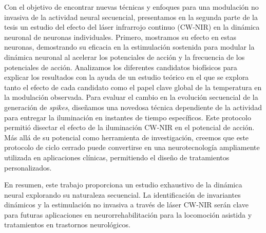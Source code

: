 Con el objetivo de encontrar nuevas técnicas y enfoques para una modulación no invasiva de la actividad neural secuencial, presentamos en la segunda parte de la tesis un estudio del efecto del láser infrarrojo continuo (CW-NIR) en la dinámica neuronal de neuronas individuales. Primero, mostramos su efecto en estas neuronas, demostrando su eficacia en la estimulación sostenida para modular la dinámica neuronal al acelerar los potenciales de acción y la frecuencia de los potenciales de acción. Analizamos los diferentes candidatos biofísicos para explicar los resultados con la ayuda de un estudio teórico en el que se explora tanto el efecto de cada candidato como el papel clave global de la temperatura en la modulación observada. Para evaluar el cambio en la evolución secuencial de la generación de \textit{spikes}, diseñamos una novedosa técnica dependiente de la actividad para entregar la iluminación en instantes de tiempo específicos. Este protocolo permitió disectar el efecto de la iluminación CW-NIR en el potencial de acción. Más allá de su potencial como herramienta de investigación, creemos que este protocolo de ciclo cerrado puede convertirse en una neurotecnología ampliamente utilizada en aplicaciones clínicas, permitiendo el diseño de tratamientos personalizados.

En resumen, este trabajo proporciona un estudio exhaustivo de la dinámica neural explorando su naturaleza secuencial. La identificación de invariantes dinámicos y la estimulación no invasiva a través de láser CW-NIR serán clave para futuras aplicaciones en neurorrehabilitación para la locomoción asistida y tratamientos en trastornos neurológicos.